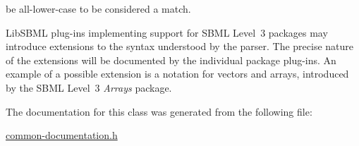 \begin{DoxyItemize}
be all-\/lower-\/case to be considered a match. \item Lib\+S\+B\+ML plug-\/ins implementing support for S\+B\+ML Level~3 packages may introduce extensions to the syntax understood by the parser. The precise nature of the extensions will be documented by the individual package plug-\/ins. An example of a possible extension is a notation for vectors and arrays, introduced by the S\+B\+ML Level~3 {\itshape Arrays} package. \end{DoxyItemize}


The documentation for this class was generated from the following file\+:\begin{DoxyCompactItemize}
\item 
\hyperlink{common-documentation_8h}{common-\/documentation.\+h}\end{DoxyCompactItemize}
